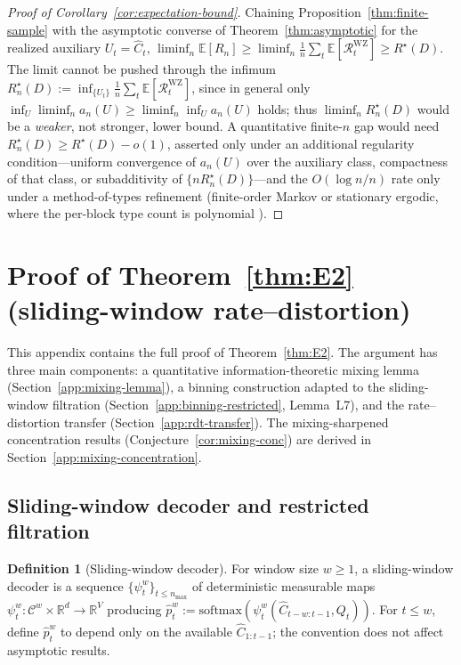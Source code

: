 \documentclass[11pt]{article}
\newcommand{\E}{\mathbb{E}}
\newcommand{\R}{\mathbb{R}}
\newcommand{\Chat}{\hat{C}}
\newcommand{\phat}{\hat{p}}
\theoremstyle{plain}
\theoremstyle{definition}
\newtheorem{definition}[theorem]{Definition}
\theoremstyle{remark}
\begin{document}
\begin{proof}[Proof of Corollary~\ref{cor:expectation-bound}]
Chaining Proposition~\ref{thm:finite-sample} with the asymptotic
converse of Theorem~\ref{thm:asymptotic} for the realized auxiliary
$U_t=\Chat_t$,
$\liminf_n\E[R_n] \ge \liminf_n\tfrac1n\sum_t\E[\mathcal{R}_t^{\mathrm{WZ}}]
\ge R^\star(D)$. The limit cannot be pushed through the infimum
$R_n^\star(D):=\inf_{\{U_t\}}\tfrac1n\sum_t\E[\mathcal{R}_t^{\mathrm{WZ}}]$,
since in general only $\inf_U\liminf_n a_n(U) \ge \liminf_n \inf_U a_n(U)$
holds; thus $\liminf_n R_n^\star(D)$ would be a \emph{weaker}, not
stronger, lower bound. A quantitative finite-$n$ gap would need
$R_n^\star(D) \ge R^\star(D) - o(1)$, asserted only under an additional
regularity condition---uniform convergence of $a_n(U)$ over the
auxiliary class, compactness of that class, or subadditivity of
$\{nR_n^\star(D)\}$---and the $O(\log n/n)$ rate only under a
method-of-types refinement (finite-order Markov or stationary ergodic,
where the per-block type count is polynomial
\citep[Sec.~11.4]{elgamal2011network}).
\end{proof}


\section{Proof of Theorem~\ref{thm:E2} (sliding-window rate--distortion)}
\label{app:mixing-proofs}

This appendix contains the full proof of Theorem~\ref{thm:E2}. The
argument has three main components: a quantitative information-theoretic
mixing lemma (Section~\ref{app:mixing-lemma}), a binning construction
adapted to the sliding-window filtration (Section~\ref{app:binning-restricted},
Lemma~L7), and the rate--distortion transfer
(Section~\ref{app:rdt-transfer}). The mixing-sharpened concentration
results (Conjecture~\ref{cor:mixing-conc}) are derived in
Section~\ref{app:mixing-concentration}.

\subsection{Sliding-window decoder and restricted filtration}\label{app:sliding}

\begin{definition}[Sliding-window decoder]\label{def:sliding-decoder-app}
For window size $w \geq 1$, a sliding-window decoder is a sequence
$\{\psi_t^w\}_{t \leq n_{\max}}$ of deterministic measurable maps
$\psi_t^w : \mathcal{C}^w \times \R^d \to \R^V$ producing
$\phat_t^w := \mathrm{softmax}(\psi_t^w(\Chat_{t-w:t-1}, Q_t))$.
For $t \leq w$, define $\phat_t^w$ to depend only on the available
$\Chat_{1:t-1}$; the convention does not affect asymptotic results.
\end{definition}
\end{document}
